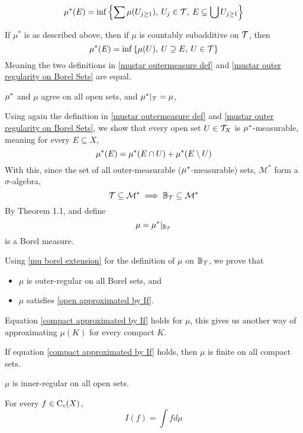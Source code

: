 \documentclass[../../main.tex]{subfiles}
\begin{document}
\begin{enumalpha}
    \begin{equation}\label{mustar outermeasure def}
        \mu^*(E)= \inf\left\{\sum \mu(U_{j\geq 1}),\:U_j\in\mathcal{T},\:E\subseteq\bigcup U_{j\geq 1}\right\}
    \end{equation}
    \label{7.2.c}
%    
%    
    \item If $\mu^*$ is as described above, then if $\mu$ is countably subadditive on $\mathcal{T}$, then
    \begin{equation}\label{mustar outer regularity on Borel Sets}
        \mu^*(E) = \inf\left\{\mu(U),\:U\supseteq E,\: U\in\mathcal{T}\right\} 
    \end{equation}
    Meaning the two definitions in \eqref{mustar outermeasure def} and \eqref{mustar outer regularity on Borel Sets} are equal.
    \label{7.2.d}
%
%
    \item $\mu^*$ and $\mu$ agree on all open sets, and $\mu^*|_{\mathcal{T}} = \mu$, 
    \label{7.2.e}
%
%    
    \item Using again the definition in \eqref{mustar outermeasure def} and \eqref{mustar outer regularity on Borel Sets}, we show that every open set $U\in\mathcal{T}_X$ is $\mu^*$-measurable, meaning for every $E\subseteq X$,
    \[
    \mu^*(E) = \mu^*(E\cap U) + \mu^*(E\setminus U)
    \]
    With this, since the set of all outer-measurable ($\mu^*$-measurable) sets, $\mathcal{M}^*$ form a $\sigma$-algebra, 
    \[
    \mathcal{T}\subseteq \mathcal{M}^*\implies \mathbb{B}_{\mathcal{T}}\subseteq\mathcal{M}^*
    \]
    By Theorem 1.1, and define 
    \begin{equation}\label{mu borel extension}
        \mu = \mu^*|_{\mathbb{B}_{\mathcal{T}}}
    \end{equation} 
    is a Borel measure.
    \label{7.2.f}
%
%
    \item Using \eqref{mu borel extension} for the definition of  $\mu$ on $\mathbb{B}_{\mathcal{T}}$, we prove that
    \begin{itemize}
        \item $\mu$ is outer-regular on all Borel sets, and
        \item $\mu$ satisfies \eqref{open approximated by If}.
    \end{itemize}
    \label{7.2.g}
%
%
    \item Equation \eqref{compact approximated by If} holds for $\mu$, this gives us another way of approximating $\mu(K)$ for every compact $K$.
    \label{7.2.h}
%
%
    \item If equation \eqref{compact approximated by If} holds, then $\mu$ is finite on all compact sets.
    \label{7.2.i}
%
%
    \item $\mu$ is inner-regular on all open sets.
    \label{7.2.j}
%
%
    \item For every $f\in\operatorname{C}_c({X})$, 
    \[
    I(f) = \int fd\mu
    \]
    \label{7.2.k}
\end{enumalpha}
\end{document}
